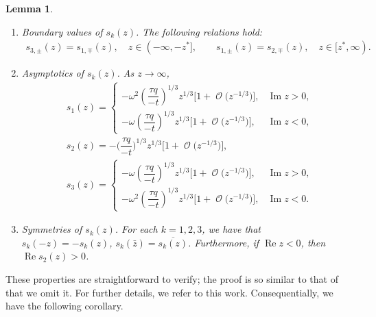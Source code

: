 \documentclass[pdftex]{sigma}
\DeclareMathOperator{\OO}{\mathcal{O}}
\numberwithin{equation}{section}
\newtheorem{Lemma}[Theorem]{Lemma}
\begin{document}
 \begin{Lemma}\quad
 \begin{enumerate}\itemsep=0pt
 \item[$(1)$] \textit{Boundary values of $s_k(z)$.}
 The following relations hold:
 \begin{gather*}
 s_{3,\pm}(z) = s_{1,\mp}(z),\quad z \in (-\infty,-z^{*}],\qquad s_{1,\pm}(z) = s_{2,\mp}(z),\quad z \in [z^{*},\infty).
 \end{gather*}
 \item[$(2)$] \textit{Asymptotics of $s_k(z)$.} As $z\to \infty$,
 \begin{align*}
 &s_1(z)=
 \begin{cases}
 -\omega^2 \left(\dfrac{\tau q}{-t}\right)^{1/3} z^{1/3}\bigl[1 + \OO\bigl(z^{-1/3}\bigr)\bigr], & \operatorname{Im} z >0,\\
 -\omega \left(\dfrac{\tau q}{-t}\right)^{1/3} z^{1/3}\bigl[1 + \OO\bigl(z^{-1/3}\bigr)\bigr], & \operatorname{Im} z <0,
 \end{cases}\\
 &s_2(z)= -(\dfrac{\tau q}{-t}\biggr)^{1/3} z^{1/3}\bigl[1+ \OO\bigl(z^{-1/3}\bigr)\bigr],\\
 &s_3(z)=
 \begin{cases}
 -\omega \left(\dfrac{\tau q}{-t}\right)^{1/3} z^{1/3}\bigl[1 + \OO\bigl(z^{-1/3}\bigr)\bigr], & \operatorname{Im} z >0,\\
 -\omega^2 \left(\dfrac{\tau q}{-t}\right)^{1/3} z^{1/3}\bigl[1 + \OO\bigl(z^{-1/3}\bigr)\bigr], & \operatorname{Im} z <0.
 \end{cases}
 \end{align*}
 \item[$(3)$] \textit{Symmetries of $s_k(z)$.} For each $k=1,2,3$, we have that
$s_k(-z) = -s_k(z)$, $s_k(\bar{z}) = \overline{s_k(z)}$.
 Furthermore, if $\operatorname{Re} z < 0$, then $\operatorname{Re} s_2(z)>0$.
 \end{enumerate}
 \end{Lemma}
These properties are straightforward to verify; the proof is so similar to that of~\cite[Lemmas~2.1 and~2.3]{DKM} that we omit it. For further details, we refer to this work. Consequentially, we have the following corollary.
\end{document}
